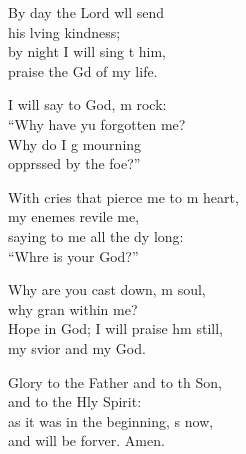 \begin{psalmverse}
\begin{patverse}
By day the Lord w\pointup{\i}ll send\Med\\
his lving kindness;\\
by night I will sing t him,\Med\\
praise the Gd of my life.

I will say to God, m rock:\Med\\
“Why have yu forgotten me?\\
Why do I g mourning\Med\\
opprssed by the foe?”

With cries that pierce me to m heart,\Med\\
my enemes revile me,\\
saying to me all the dy long:\Med\\
“Whre is your God?”

Why are you cast down, m soul,\Med\\
why gran within me?\\
Hope in God; I will praise h\pointup{\i}m still,\Med\\
my svior and my God.

Glory to the Father and to th Son,\Med\\
and to the Hly Spirit:\\
as it was in the beginning, \pointup{\i}s now,\Med\\
and will be forver. Amen. 
  \end{patverse}
\end{psalmverse}
